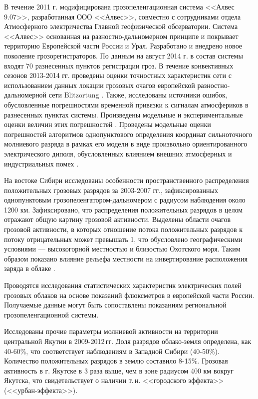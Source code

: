 В течение 2011 г. модифицирована грозопеленгационная система <<Алвес 9.07>>\cite{AlwesSite}, разработанная ООО <<Алвес>>, совместно с сотрудниками отдела Атмосферного электричества Главной геофизической обсерватории. Система <<Алвес>> основанная на разностно-дальномерном принципе и покрывает территорию Европейской части России и Урал. Разработано и внедрено новое поколение грозорегистраторов. По данным на август 2014 г. в состав системы входят 70 разнесенных пунктов регистрации гроз. В течение конвективных сезонов 2013-2014 гг. проведены оценки точностных характеристик сети с использованием данных локации грозовых очагов европейской разностно-дальномерной сети Blitzortung \cite{Snegurov2010, AlwesSite}. Также, исследованы источники ошибок, обусловленные погрешностями временной привязки к сигналам атмосфериков в разнесенных пунктах системы. Произведены модельные и экспериментальные оценки величин этих погрешностей \cite{Kononov2011, Kononov2014}. Проведены модельные оценки погрешностей алгоритмов однопунктового определения координат сильноточного молниевого разряда в рамках его модели в виде произвольно ориентированного электрического диполя, обусловленных влиянием внешних атмосферных и индустриальных помех \cite{Kononov2013}.

На востоке Сибири исследованы особенности пространственного распределения положительных грозовых разрядов за 2003-2007 гг., зафиксированных однопунктовым грозопеленгатором-дальномером с радиусом наблюдения около 1200 км. Зафиксировано, что распределения положительных разрядов в целом отражают общую картину грозовой активности. Выделены области очагов грозовой активности, в которых отношение потока положительных разрядов к потоку отрицательных может превышать 1, что обусловлено географическими условиями — высокогорной местностью и близостью Охотского моря. Таким образом показано влияние рельефа местности на инвертирование расположения заряда в облаке \cite{Mullayarov2009}.

Проводятся исследования статистических характеристик электрических полей грозовых облаков на основе показаний флюксметров \cite{Our2013} в европейской части России. Получаемые данные могут быть сопоставлены показаниям региональной грозопеленгационной системы.

Исследованы прочие параметры молниевой активности на территории центральной Якутии в 2009-2012\,гг. Доля разрядов облако-земля определена, как 40-60\%, что соответствует наблюдениям в Западной Сибири (40-50\%). Количество положительных разрядов в землю составило 8-15\%. Грозовая активность в г. Якутске в 3 раза выше, чем в зоне радиусом 400 км вокруг Якутска, что свидетельствует о наличии т.\,н. <<городского эффекта>> (<<урбан-эффекта>>). \cite{Kozlov2014}

